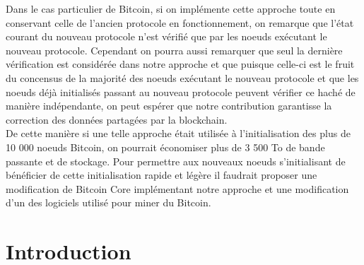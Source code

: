 \documentclass[12pt,a4paper]{article}
\begin{document}
	Dans le cas particulier de Bitcoin, si on implémente cette approche toute en conservant celle de l'ancien protocole en fonctionnement, on remarque que l'état courant du nouveau protocole n'est vérifié que par les noeuds exécutant le nouveau protocole. Cependant on pourra aussi remarquer que seul la dernière vérification est considérée dans notre approche et que puisque celle-ci est le fruit du concensus de la majorité des noeuds exécutant le nouveau protocole et que les noeuds déjà initialisés passant au nouveau protocole peuvent vérifier ce haché de manière indépendante, on peut espérer que notre contribution garantisse la correction des données partagées par la blockchain.\\
	De cette manière si une telle approche était utilisée à l'initialisation des plus de 10 000 noeuds Bitcoin, on pourrait économiser plus de 3 500 To de bande passante et de stockage. Pour permettre aux nouveaux noeuds s'initialisant de bénéficier de cette initialisation rapide et légère il faudrait proposer une modification de Bitcoin Core implémentant notre approche et une modification d'un des logiciels utilisé pour miner du Bitcoin.
	
	\tableofcontents
	
	\newpage
	
	\section{Introduction} %
	
\end{document}

